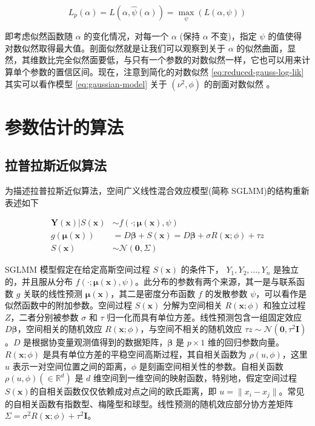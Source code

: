 \documentclass[12pt,a4paper,UTF8,twoside]{book}
\theoremstyle{definition}
\theoremstyle{definition}
\theoremstyle{definition}
\theoremstyle{remark}
\begin{document}
\begin{equation}
L_{p}(\alpha) = L(\alpha,\hat{\psi}(\alpha)) = \max_{\psi} (L(\alpha,\psi))
\label{eq:profile-log-lik}
\end{equation}

\noindent 即考虑似然函数随 \(\alpha\) 的变化情况，对每一个 \(\alpha\)
(保持 \(\alpha\) 不变)，指定 \(\psi\)
的值使得对数似然取得最大值。剖面似然就是让我们可以观察到关于 \(\alpha\)
的似然曲面，显然，其维数比完全似然面要低，与只有一个参数的对数似然一样，它也可以用来计算单个参数的置信区间。现在，注意到简化的对数似然
\eqref{eq:reduced-gauss-log-lik} 其实可以看作模型 \eqref{eq:gaussian-model}
关于 \((\nu^2,\phi)\) 的剖面对数似然 \citep{Diggle2007}。

\hypertarget{sec:algrithms}{%
\section{参数估计的算法}\label{sec:algrithms}}

\hypertarget{subsec:LA}{%
\subsection{拉普拉斯近似算法}\label{subsec:LA}}

为描述拉普拉斯近似算法，空间广义线性混合效应模型(简称
SGLMM)的结构重新表述如下

\begin{equation}
\begin{aligned}
\mathbf{Y(x)} | S(\mathbf{x}) & \sim  f(\cdot;\boldsymbol{\mu(x)},\psi) \\
g(\boldsymbol{\mu(x)}) & =  D\boldsymbol{\beta} + S(\mathbf{x}) 
                         = D\boldsymbol{\beta} + \sigma R(\mathbf{x};\phi) + \tau z \\
S(\mathbf{x}) & \sim  \mathcal{N}(\mathbf{0},\Sigma)
\end{aligned} \label{eq:sglmm}
\end{equation}

\noindent SGLMM 模型假定在给定高斯空间过程 \(S(\mathbf{x})\) 的条件下，
\(Y_1,Y_2,\ldots,Y_n\) 是独立的，并且服从分布
\(f(\cdot;\boldsymbol{\mu(x)},\psi)\)。此分布的参数有两个来源，其一是与联系函数
\(g\) 关联的线性预测 \(\boldsymbol{\mu(x)}\)，其二是密度分布函数 \(f\)
的发散参数 \(\psi\)，可以看作是似然函数中的附加参数。空间过程
\(S(\mathbf{x})\) 分解为空间相关 \(R(\mathbf{x};\phi)\) 和独立过程
\(Z\)，二者分别被参数 \(\sigma\) 和 \(\tau\)
归一化而具有单位方差。线性预测包含一组固定效应
\(D\boldsymbol{\beta}\)，空间相关的随机效应
\(R(\mathbf{x};\phi)\)，与空间不相关的随机效应
\(\tau z \sim \mathcal{N}(\mathbf{0},\tau^2\mathbf{I})\)。\(D\)
是根据协变量观测值得到的数据矩阵，\(\boldsymbol{\beta}\) 是
\(p \times 1\) 维的回归参数向量。\(R(\mathbf{x};\phi)\)
是具有单位方差的平稳空间高斯过程，其自相关函数为 \(\rho(u,\phi)\)，这里
\(u\) 表示一对空间位置之间的距离，\(\phi\)
是刻画空间相关性的参数。自相关函数 \(\rho(u,\phi) (\in \mathbb{R}^d)\)
是 \(d\) 维空间到一维空间的映射函数，特别地，假定空间过程
\(S(\mathbf{x})\)的自相关函数仅仅依赖成对点之间的欧氏距离，即
\(u =\|x_i - x_j\|\)。常见的自相关函数有指数型、梅隆型和球型。线性预测的随机效应部分协方差矩阵
\(\Sigma = \sigma^2 R(\mathbf{x};\phi) + \tau^2\mathbf{I}\)。
\end{document}
